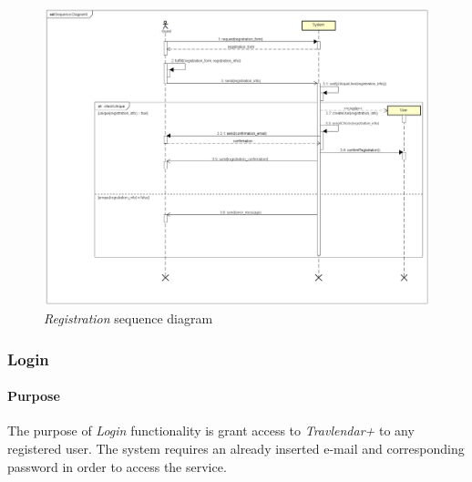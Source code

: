 \begin{figure}
	\includegraphics[width=\textheight, height=\textwidth, keepaspectratio=true]{Img/RegistrationSQ}
	\caption{\emph{Registration} sequence diagram}
	\label{fig:registrationsq}
\end{figure}

\clearpage
\subsubsection{Login}
\paragraph*{Purpose\\}
The purpose of \emph{Login} functionality is grant access to \emph{Travlendar+} to any registered user. The system requires an already inserted e-mail and corresponding password in order to access the service.

